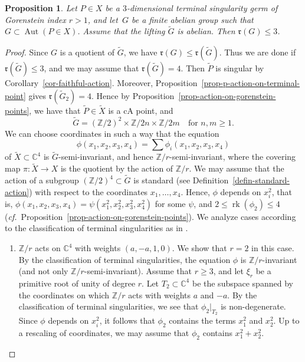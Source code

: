 \documentclass[11pt]{amsart}
\numberwithin{equation}{section}
\newtheorem{proposition}[thm]{Proposition}
\theoremstyle{definition}
\theoremstyle{remark}
\DeclareMathOperator{\Aut}{Aut}
\DeclareMathOperator{\rk}{rk}
\begin{document}
\begin{proposition}
\label{prop-terminal-point-abelian}
Let $P\in X$ be a $3$-dimensional terminal singularity germ of Gorenstein index $r>1$, and let~$G$ be a finite abelian group such that $G\subset \Aut(P\in X)$.
Assume that the lifting $\widetilde{G}$ is abelian. Then
$\mathfrak{r}(G)\leq 3$.
\end{proposition}

\begin{proof}
Since $G$ is a quotient of $\widetilde G$, we have $\mathfrak r(G)\leq\mathfrak r(\widetilde G)$. Thus we are done if $\mathfrak r(\widetilde G)\leq3$, and we may assume that $\mathfrak{r}(\widetilde{G})=4$. Then $\widetilde P$ is singular by Corollary~\ref{cor-faithful-action}. Moreover, Proposition~\ref{prop-p-action-on-terminal-point} gives $\mathfrak r(\widetilde G_2)=4$. Hence by Proposition~\ref{prop-action-on-gorenstein-points}, we have that $\widetilde{P}\in\widetilde{X}$ is a cA point, and 
\[
\widetilde{G}=(\mathbb{Z}/2)^2\times\mathbb{Z}/2n\times\mathbb{Z}/2m \quad \text{for } n, m\geq 1.
\] 
We can choose coordinates in such a way that the equation 
\[
\phi(x_1,x_2,x_3,x_4)=\sum \phi_i(x_1,x_2,x_3,x_4)
\]
of $\widetilde{X}\subset\mathbb{C}^4$ is $\widetilde{G}$-semi-invariant, and hence $\mathbb{Z}/r$-semi-invariant, where the covering map $\pi\colon \widetilde{X}\to X$ is the quotient by the action of $\mathbb{Z}/r$. 
We may assume that the action of a subgroup $(\mathbb{Z}/2)^4\subset \widetilde{G}$ is standard (see Definition~\ref{defin-standard-action}) with respect to the coordinates $x_1,\ldots,x_4$. 
Hence, $\phi$ depends on $x_i^2$,  {that is, $\phi(x_1,x_2,x_3,x_4)=\psi(x_1^2,x_2^2,x_3^2,x_4^2)$ for some $\psi$,} and $2\leq \rk(\phi_2)\leq 4$ (\textit{cf.}~Proposition~\ref{prop-action-on-gorenstein-points}). 
We analyze cases according to the classification of terminal singularities as in \cite[Section~6.1]{Re85}.

\begin{enumerate}[wide,label=\textit{Case}~\arabic*:, ref=\arabic*]
\item \label{case1}
 $\mathbb{Z}/r$ acts on $\mathbb{C}^4$ with  weights $(a,-a,1,0)$. We show that $r=2$ in this case. 
By the classification of terminal singularities, the equation $\phi$ is $\mathbb{Z}/r$-invariant  {(and not only $\mathbb{Z}/r$-semi-invariant)}. 
Assume that $r\geq 3$, and let $\xi_r$ be a primitive root of unity of degree $r$. 
Let $T_2\subset \mathbb{C}^4$ be the subspace spanned by the coordinates on which $\mathbb{Z}/r$ acts with weights $a$ and $-a$. By the classification of terminal singularities, we see that $\phi_2|_{T_2}$ is non-degenerate. Since $\phi$ depends on $x_i^2$, it follows that $\phi_2$ contains the terms $x_1^2$ and $x_2^2$. Up to a rescaling of coordinates, we may assume that $\phi_2$ contains $x_1^2+x_2^2$. 


\end{enumerate}
\end{proof}
\end{document}
